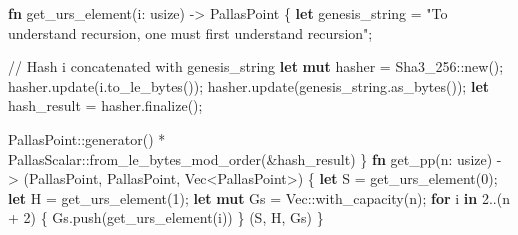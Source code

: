 \documentclass[
]{article}
\newenvironment{Shaded}{\begin{snugshade}}{\end{snugshade}}
\newcommand{\CommentTok}[1]{\textcolor[rgb]{0.49,0.44,0.39}{#1}}
\newcommand{\ControlFlowTok}[1]{\textcolor[rgb]{0.80,0.14,0.11}{\textbf{#1}}}
\newcommand{\DataTypeTok}[1]{\textcolor[rgb]{0.71,0.46,0.08}{#1}}
\newcommand{\DecValTok}[1]{\textcolor[rgb]{0.56,0.25,0.44}{#1}}
\newcommand{\KeywordTok}[1]{\textcolor[rgb]{0.80,0.14,0.11}{\textbf{#1}}}
\newcommand{\NormalTok}[1]{\textcolor[rgb]{0.16,0.16,0.16}{#1}}
\newcommand{\OperatorTok}[1]{\textcolor[rgb]{0.56,0.25,0.44}{#1}}
\newcommand{\PreprocessorTok}[1]{\textcolor[rgb]{0.03,0.40,0.47}{#1}}
\newcommand{\StringTok}[1]{\textcolor[rgb]{0.60,0.59,0.10}{#1}}
\begin{document}
\begin{Shaded}
\begin{Highlighting}[numbers=left,,]
\KeywordTok{fn}\NormalTok{ get\_urs\_element(i}\OperatorTok{:} \DataTypeTok{usize}\NormalTok{) }\OperatorTok{{-}\textgreater{}}\NormalTok{ PallasPoint }\OperatorTok{\{}
    \KeywordTok{let}\NormalTok{ genesis\_string }\OperatorTok{=} \StringTok{"To understand recursion, one must first understand recursion"}\OperatorTok{;}

    \CommentTok{// Hash \textasciigrave{}i\textasciigrave{} concatenated with \textasciigrave{}genesis\_string\textasciigrave{}}
    \KeywordTok{let} \KeywordTok{mut}\NormalTok{ hasher }\OperatorTok{=} \PreprocessorTok{Sha3\_256::}\NormalTok{new()}\OperatorTok{;}
\NormalTok{    hasher}\OperatorTok{.}\NormalTok{update(i}\OperatorTok{.}\NormalTok{to\_le\_bytes())}\OperatorTok{;}
\NormalTok{    hasher}\OperatorTok{.}\NormalTok{update(genesis\_string}\OperatorTok{.}\NormalTok{as\_bytes())}\OperatorTok{;}
    \KeywordTok{let}\NormalTok{ hash\_result }\OperatorTok{=}\NormalTok{ hasher}\OperatorTok{.}\NormalTok{finalize()}\OperatorTok{;}

    \PreprocessorTok{PallasPoint::}\NormalTok{generator() }\OperatorTok{*} \PreprocessorTok{PallasScalar::}\NormalTok{from\_le\_bytes\_mod\_order(}\OperatorTok{\&}\NormalTok{hash\_result)}
\OperatorTok{\}}
\KeywordTok{fn}\NormalTok{ get\_pp(n}\OperatorTok{:} \DataTypeTok{usize}\NormalTok{) }\OperatorTok{{-}\textgreater{}}\NormalTok{ (PallasPoint}\OperatorTok{,}\NormalTok{ PallasPoint}\OperatorTok{,} \DataTypeTok{Vec}\OperatorTok{\textless{}}\NormalTok{PallasPoint}\OperatorTok{\textgreater{}}\NormalTok{) }\OperatorTok{\{}
    \KeywordTok{let}\NormalTok{ S }\OperatorTok{=}\NormalTok{ get\_urs\_element(}\DecValTok{0}\NormalTok{)}\OperatorTok{;}
    \KeywordTok{let}\NormalTok{ H }\OperatorTok{=}\NormalTok{ get\_urs\_element(}\DecValTok{1}\NormalTok{)}\OperatorTok{;}
    \KeywordTok{let} \KeywordTok{mut}\NormalTok{ Gs }\OperatorTok{=} \DataTypeTok{Vec}\PreprocessorTok{::}\NormalTok{with\_capacity(n)}\OperatorTok{;}
    \ControlFlowTok{for}\NormalTok{ i }\KeywordTok{in} \DecValTok{2}\OperatorTok{..}\NormalTok{(n }\OperatorTok{+} \DecValTok{2}\NormalTok{) }\OperatorTok{\{}
\NormalTok{        Gs}\OperatorTok{.}\NormalTok{push(get\_urs\_element(i))}
    \OperatorTok{\}}
\NormalTok{    (S}\OperatorTok{,}\NormalTok{ H}\OperatorTok{,}\NormalTok{ Gs)}
\OperatorTok{\}}
\end{Highlighting}
\end{Shaded}
\end{document}
